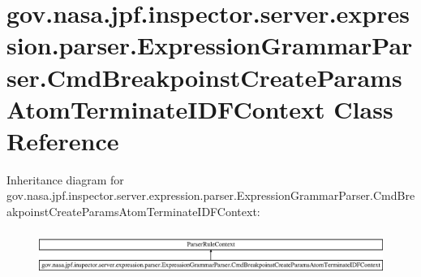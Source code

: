 \hypertarget{classgov_1_1nasa_1_1jpf_1_1inspector_1_1server_1_1expression_1_1parser_1_1_expression_grammar_pa33db42909734e187834b73b54c5beb59}{}\section{gov.\+nasa.\+jpf.\+inspector.\+server.\+expression.\+parser.\+Expression\+Grammar\+Parser.\+Cmd\+Breakpoinst\+Create\+Params\+Atom\+Terminate\+I\+D\+F\+Context Class Reference}
\label{classgov_1_1nasa_1_1jpf_1_1inspector_1_1server_1_1expression_1_1parser_1_1_expression_grammar_pa33db42909734e187834b73b54c5beb59}
Inheritance diagram for gov.\+nasa.\+jpf.\+inspector.\+server.\+expression.\+parser.\+Expression\+Grammar\+Parser.\+Cmd\+Breakpoinst\+Create\+Params\+Atom\+Terminate\+I\+D\+F\+Context\+:\begin{figure}[H]
\begin{center}
\leavevmode
\includegraphics[height=1.458333cm]{classgov_1_1nasa_1_1jpf_1_1inspector_1_1server_1_1expression_1_1parser_1_1_expression_grammar_pa33db42909734e187834b73b54c5beb59}
\end{center}
\end{figure}

